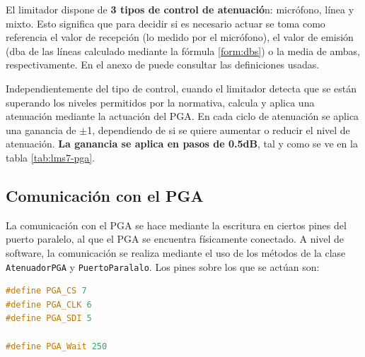El limitador dispone de \textbf{3 tipos de control de atenuació}n: micrófono, línea y mixto. Esto significa que para decidir si es necesario actuar se toma como referencia el valor de recepción (lo medido por el micrófono), el valor de emisión (\acrshort{dba} de las líneas calculado mediante la fórmula \ref{form:dbs}) o la media de ambas, respectivamente. En el anexo de  puede consultar las definiciones usadas.

Independientemente del tipo de control, cuando el limitador detecta que se están superando los niveles permitidos por la normativa, calcula y aplica una atenuación mediante la actuación del \acrshort{PGA}. En cada ciclo de atenuación se aplica una ganancia de $\pm$1, dependiendo de si se quiere aumentar o reducir el nivel de atenuación. \textbf{La ganancia se aplica en pasos de 0.5dB}, tal y como se ve en la tabla \ref{tab:lms7-pga}.

\subsection{Comunicación con el PGA}

La comunicación con el \acrshort{PGA} se hace mediante la escritura en ciertos pines del puerto paralelo, al que el PGA se encuentra físicamente conectado. A nivel de software, la comunicación se realiza mediante el uso de los métodos de la clase \verb|AtenuadorPGA| y \verb|PuertoParalalo|. Los pines sobre los que se actúan son: \\

\begin{lstlisting}[language=c++, label={lst:lsm7-pga}, caption={Pines del puerto paralelo conectados al PGA}]
#define PGA_CS 7
#define PGA_CLK 6
#define PGA_SDI 5

#define PGA_Wait 250
\end{lstlisting}